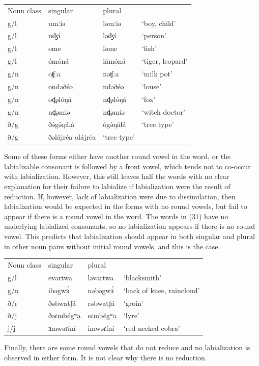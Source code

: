 \ea
\begin{tabular}[t]{llll}
Noun class	&	singular		&	plural\\
g/l	&	umːiə	&	ləmːiə	 	&	‘boy, child’\\
g/l	&	uʤí		&	ləʤí		&	‘person’\\
g/l	&	ome		&	ləme			&	‘fish’\\
g/l	&	ómóná	&	lámóná		&	‘tiger, leopard’\\
g/n	&	oʧːa	&	nəʧːa		&	‘milk pot’\\
g/n	&	ondəðéə	&	ndəðéə		&	‘louse’\\
g/n	&	od̪əlóŋá	&	nd̪əlóŋá		&	‘fox’\\
g/n	&	ud̪əmiə	&	nd̪əmiə		&	‘witch doctor’\\
ð/g	&	ðə́gə́ŋálá	&	ógə́ŋálá		&	‘tree type’\\
ð/g	&	ðəlájréa	olájréa		&	‘tree type’\\
\end{tabular}
\z

Some of these forms either have another round vowel in the word, or the labializable consonant is followed by a front vowel, which tends not to co-occur with labialization. However, this still leaves half the words with no clear explanation for their failure to labialize if labialization were the result of reduction. If, however, lack of labialization were due to dissimilation, then labialization would be expected in the forms with no round vowels, but fail to appear if there is a round vowel in the word. The words in (31) have no underlying labialized consonants, so no labialization appears if there is no round vowel. This predicts that labialization should appear in both singular and plural in other noun pairs without initial round vowels, and this is the case. 

\ea
\begin{tabular}[t]{llll}
	Noun class	&	singular		&	plural\\
	g/l			&	evartwa		&	ləvartwa	&	‘blacksmith’\\
	g/n			&	ibəgwɜ́		&	nəbəgwɜ́	&	‘back of knee, raincloud’\\
	ð/r			&	ðəbwatʃá	&	rəbwatʃá&	‘groin’\\
	ð/j			&	ðəɾmbégʷa	&	eɾmbégʷa&	‘lyre’\\
	j/j			&	ɜmwəɾíní	&	imwəɾíní&	‘red necked cobra’\\
\end{tabular}
\z

Finally, there are some round vowels that do not reduce and no labialization is observed in either form. It is not clear why there is no reduction. 

